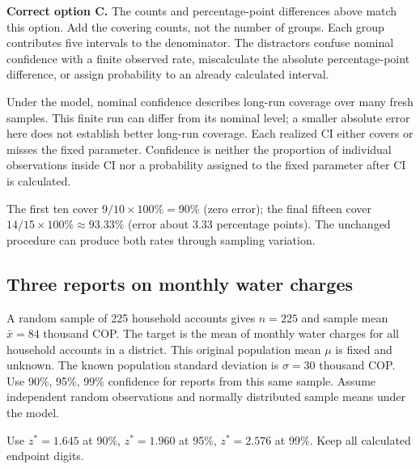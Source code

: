 \textbf{Correct option C.} The counts and percentage-point differences above match this option. Add the covering counts, not the number of groups. Each group contributes five intervals to the denominator. The distractors confuse nominal confidence with a finite observed rate, miscalculate the absolute percentage-point difference, or assign probability to an already calculated interval.

Under the model, nominal confidence describes long-run coverage over many fresh samples. This finite run can differ from its nominal level; a smaller absolute error here does not establish better long-run coverage. Each realized $\mathrm{CI}$ either covers or misses the fixed parameter. Confidence is neither the proportion of individual observations inside $\mathrm{CI}$ nor a probability assigned to the fixed parameter after $\mathrm{CI}$ is calculated.

The first ten cover $9/10\times100\%=90\%$ (zero error); the final fifteen cover $14/15\times100\%\approx93.33\%$ (error about 3.33 percentage points). The unchanged procedure can produce both rates through sampling variation.
\par\nopagebreak[4]
\par\vspace{3mm}
\clearpage
\subsection{Three reports on monthly water charges}
\label{prob:c2-advanced-d}

A random sample of 225 household accounts gives $n=225$ and sample mean $\bar{x}=84$ thousand COP. The target is the mean of monthly water charges for all household accounts in a district. This original population mean $\mu$ is fixed and unknown. The known population standard deviation is $\sigma=30$ thousand COP. Use 90\%, 95\%, 99\% confidence for reports from this same sample. Assume independent random observations and normally distributed sample means under the model.

Use $z^*=1.645$ at 90\%, $z^*=1.960$ at 95\%, $z^*=2.576$ at 99\%. Keep all calculated endpoint digits.

